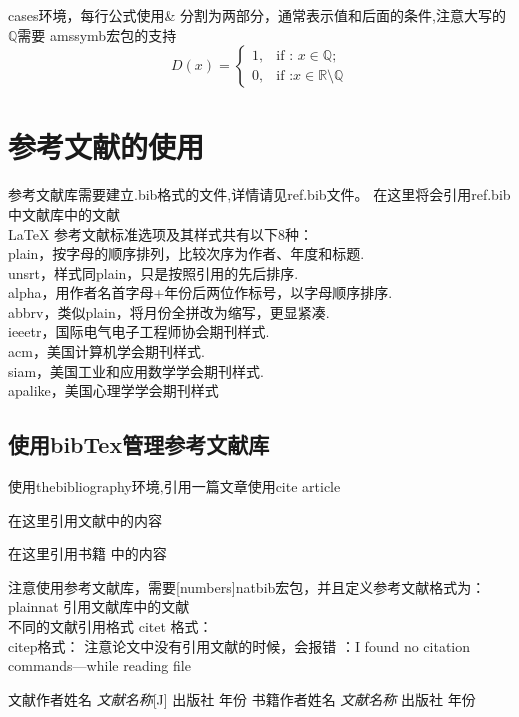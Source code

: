 \documentclass{ctexart}
\begin{document}
    cases环境，每行公式使用\& 分割为两部分，通常表示值和后面的条件,注意大写的$\mathbb{Q}$需要
    amssymb宏包的支持
    \begin{equation}
        D(x) = \begin{cases}
            1, & \text{if : } x\in\mathbb{Q}; \\
            0, & \text{if :} x \in \mathbb{R} \setminus \mathbb{Q}
        \end{cases}
    \end{equation}

    \section{参考文献的使用}

    参考文献库需要建立.bib格式的文件,详情请见ref.bib文件。
    在这里将会引用ref.bib中文献库中的文献\\
    LaTeX 参考文献标准选项及其样式共有以下8种：\\
    plain，按字母的顺序排列，比较次序为作者、年度和标题.\\
    unsrt，样式同plain，只是按照引用的先后排序.\\
    alpha，用作者名首字母+年份后两位作标号，以字母顺序排序.\\
    abbrv，类似plain，将月份全拼改为缩写，更显紧凑.\\
    ieeetr，国际电气电子工程师协会期刊样式.\\
    acm，美国计算机学会期刊样式.\\
    siam，美国工业和应用数学学会期刊样式.\\
    apalike，美国心理学学会期刊样式\\
    
    \subsection{使用bibTex管理参考文献库}

    使用thebibliography环境,引用一篇文章使用cite article

    在这里引用文献\cite{article1}中的内容

    在这里引用书籍\cite{book1} 中的内容

    注意使用参考文献库，需要[numbers]{natbib}宏包，并且定义参考文献格式为：plainnat
    引用文献库中的文献\cite{heilman2010good} \\
    不同的文献引用格式 citet 格式：\citet{heilman2010good} \\
    citep格式： \citep{heilman2010good}
    注意论文中没有引用文献的时候，会报错 ：I found no citation commands---while reading file
    
    

    \begin{thebibliography}{99}
        文献作者姓名 \emph{文献名称}[J] 出版社 年份
         书籍作者姓名 \emph{文献名称} 出版社  年份
    \end{thebibliography}
    
\end{document}
